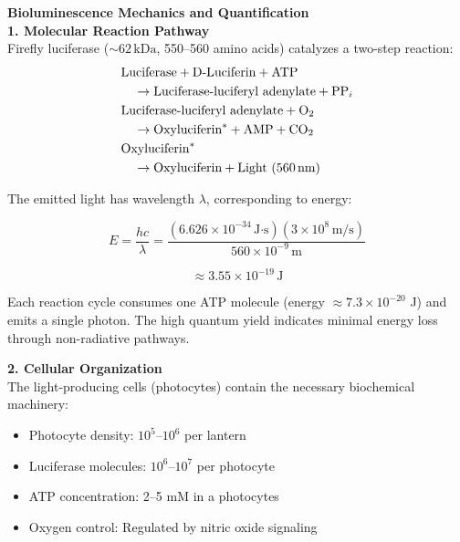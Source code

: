 \begin{technical}
{\Large\textbf{Bioluminescence Mechanics and Quantification}}\\[0.2em]

\noindent\textbf{1. Molecular Reaction Pathway}\\
Firefly luciferase ($\sim 62\,\text{kDa}$, 550–560 amino acids) catalyzes a two-step reaction:
\begin{align}
&\text{Luciferase} + \text{D-Luciferin} + \text{ATP} \notag\\
&\quad\rightarrow \text{Luciferase-luciferyl adenylate} + \text{PP}_i \notag\\
&\text{Luciferase-luciferyl adenylate} + \text{O}_2 \notag\\
&\quad\rightarrow \text{Oxyluciferin}^* + \text{AMP} + \text{CO}_2 \notag\\
&\text{Oxyluciferin}^* \notag\\
&\quad\rightarrow \text{Oxyluciferin} + \text{Light (560\,nm)}
\end{align}

The emitted light has wavelength $\lambda$, corresponding to energy:

\begin{equation}
E = \frac{hc}{\lambda} = 
\frac{(6.626 \times 10^{-34}\,\text{J·s}) (3 \times 10^8\,\text{m/s})}
{560 \times 10^{-9}\,\text{m}} 
\end{equation}

\begin{equation}
\approx 3.55 \times 10^{-19}\,\text{J}
\end{equation}

Each reaction cycle consumes one ATP molecule (energy $\approx 7.3 \times 10^{-20}$ J) and emits a single photon. The high quantum yield indicates minimal energy loss through non-radiative pathways.

\noindent\textbf{2. Cellular Organization}\\
The light-producing cells (photocytes) contain the necessary biochemical machinery:

\begin{itemize}[leftmargin=*,topsep=0pt,itemsep=0pt]
    \item Photocyte density: $10^5$–$10^6$ per lantern
    \item Luciferase molecules: $10^6$–$10^7$ per photocyte
    \item ATP concentration: 2–5 mM in a photocytes
    \item Oxygen control: Regulated by nitric oxide signaling
\end{itemize}


\end{technical}
